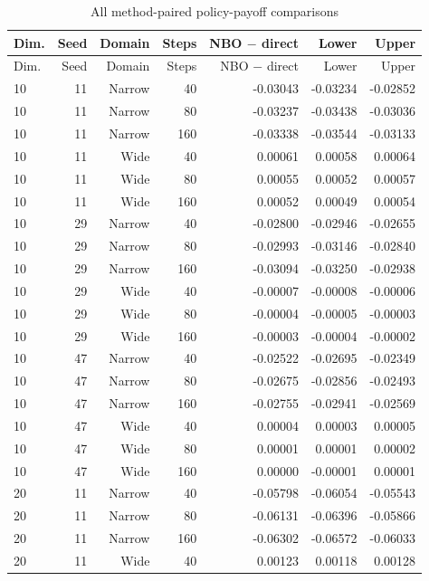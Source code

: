 \begin{small}
\begin{longtable}{lrrrrrr}
\caption{All method-paired policy-payoff comparisons}\\
\toprule
Dim. & Seed & Domain & Steps & NBO $-$ direct & Lower & Upper \\
\midrule\endfirsthead
\toprule
Dim. & Seed & Domain & Steps & NBO $-$ direct & Lower & Upper \\
\midrule\endhead
10 & 11 & Narrow & 40 & -0.03043 & -0.03234 & -0.02852 \\
10 & 11 & Narrow & 80 & -0.03237 & -0.03438 & -0.03036 \\
10 & 11 & Narrow & 160 & -0.03338 & -0.03544 & -0.03133 \\
10 & 11 & Wide & 40 & 0.00061 & 0.00058 & 0.00064 \\
10 & 11 & Wide & 80 & 0.00055 & 0.00052 & 0.00057 \\
10 & 11 & Wide & 160 & 0.00052 & 0.00049 & 0.00054 \\
10 & 29 & Narrow & 40 & -0.02800 & -0.02946 & -0.02655 \\
10 & 29 & Narrow & 80 & -0.02993 & -0.03146 & -0.02840 \\
10 & 29 & Narrow & 160 & -0.03094 & -0.03250 & -0.02938 \\
10 & 29 & Wide & 40 & -0.00007 & -0.00008 & -0.00006 \\
10 & 29 & Wide & 80 & -0.00004 & -0.00005 & -0.00003 \\
10 & 29 & Wide & 160 & -0.00003 & -0.00004 & -0.00002 \\
10 & 47 & Narrow & 40 & -0.02522 & -0.02695 & -0.02349 \\
10 & 47 & Narrow & 80 & -0.02675 & -0.02856 & -0.02493 \\
10 & 47 & Narrow & 160 & -0.02755 & -0.02941 & -0.02569 \\
10 & 47 & Wide & 40 & 0.00004 & 0.00003 & 0.00005 \\
10 & 47 & Wide & 80 & 0.00001 & 0.00001 & 0.00002 \\
10 & 47 & Wide & 160 & 0.00000 & -0.00001 & 0.00001 \\
20 & 11 & Narrow & 40 & -0.05798 & -0.06054 & -0.05543 \\
20 & 11 & Narrow & 80 & -0.06131 & -0.06396 & -0.05866 \\
20 & 11 & Narrow & 160 & -0.06302 & -0.06572 & -0.06033 \\
20 & 11 & Wide & 40 & 0.00123 & 0.00118 & 0.00128 \\

\end{longtable}
\end{small}
